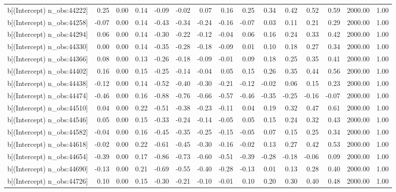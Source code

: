 \begin{table}[ht]
\begin{tabular}{rrrrrrrrrrrrrrr}
  b[(Intercept) n\_obs:44222] & 0.25 & 0.00 & 0.14 & -0.09 & -0.02 & 0.07 & 0.16 & 0.25 & 0.34 & 0.42 & 0.52 & 0.59 & 2000.00 & 1.00 \\ 
  b[(Intercept) n\_obs:44258] & -0.07 & 0.00 & 0.14 & -0.43 & -0.34 & -0.24 & -0.16 & -0.07 & 0.03 & 0.11 & 0.21 & 0.29 & 2000.00 & 1.00 \\ 
  b[(Intercept) n\_obs:44294] & 0.06 & 0.00 & 0.14 & -0.30 & -0.22 & -0.12 & -0.04 & 0.06 & 0.16 & 0.24 & 0.33 & 0.42 & 2000.00 & 1.00 \\ 
  b[(Intercept) n\_obs:44330] & 0.00 & 0.00 & 0.14 & -0.35 & -0.28 & -0.18 & -0.09 & 0.01 & 0.10 & 0.18 & 0.27 & 0.34 & 2000.00 & 1.00 \\ 
  b[(Intercept) n\_obs:44366] & 0.08 & 0.00 & 0.13 & -0.26 & -0.18 & -0.09 & -0.01 & 0.09 & 0.18 & 0.25 & 0.35 & 0.41 & 2000.00 & 1.00 \\ 
  b[(Intercept) n\_obs:44402] & 0.16 & 0.00 & 0.15 & -0.25 & -0.14 & -0.04 & 0.05 & 0.15 & 0.26 & 0.35 & 0.44 & 0.56 & 2000.00 & 1.00 \\ 
  b[(Intercept) n\_obs:44438] & -0.12 & 0.00 & 0.14 & -0.52 & -0.40 & -0.30 & -0.21 & -0.12 & -0.02 & 0.06 & 0.15 & 0.23 & 2000.00 & 1.00 \\ 
  b[(Intercept) n\_obs:44474] & -0.46 & 0.00 & 0.16 & -0.88 & -0.76 & -0.66 & -0.57 & -0.46 & -0.35 & -0.25 & -0.16 & -0.07 & 2000.00 & 1.00 \\ 
  b[(Intercept) n\_obs:44510] & 0.04 & 0.00 & 0.22 & -0.51 & -0.38 & -0.23 & -0.11 & 0.04 & 0.19 & 0.32 & 0.47 & 0.61 & 2000.00 & 1.00 \\ 
  b[(Intercept) n\_obs:44546] & 0.05 & 0.00 & 0.15 & -0.33 & -0.24 & -0.14 & -0.05 & 0.05 & 0.15 & 0.24 & 0.32 & 0.43 & 2000.00 & 1.00 \\ 
  b[(Intercept) n\_obs:44582] & -0.04 & 0.00 & 0.16 & -0.45 & -0.35 & -0.25 & -0.15 & -0.05 & 0.07 & 0.15 & 0.25 & 0.34 & 2000.00 & 1.00 \\ 
  b[(Intercept) n\_obs:44618] & -0.02 & 0.00 & 0.22 & -0.61 & -0.45 & -0.30 & -0.16 & -0.02 & 0.13 & 0.27 & 0.42 & 0.53 & 2000.00 & 1.00 \\ 
  b[(Intercept) n\_obs:44654] & -0.39 & 0.00 & 0.17 & -0.86 & -0.73 & -0.60 & -0.51 & -0.39 & -0.28 & -0.18 & -0.06 & 0.09 & 2000.00 & 1.00 \\ 
  b[(Intercept) n\_obs:44690] & -0.13 & 0.00 & 0.21 & -0.69 & -0.55 & -0.40 & -0.28 & -0.13 & 0.01 & 0.13 & 0.28 & 0.40 & 2000.00 & 1.00 \\ 
  b[(Intercept) n\_obs:44726] & 0.10 & 0.00 & 0.15 & -0.30 & -0.21 & -0.10 & -0.01 & 0.10 & 0.20 & 0.30 & 0.40 & 0.48 & 2000.00 & 1.00 \\ 

\end{tabular}
\end{table}

